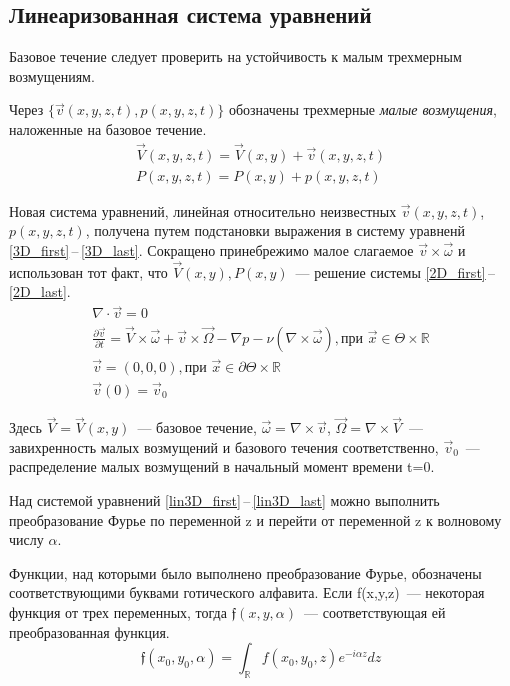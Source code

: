 \subsection{Линеаризованная система уравнений}

Базовое течение следует проверить на устойчивость к малым трехмерным возмущениям.

Через $\{ \vec v(x,y,z,t), p(x,y,z,t) \} $ обозначены трехмерные \textit{малые возмущения}, наложенные на базовое течение. 
\begin{gather*}
  \vec V(x,y,z,t) = \vec V(x,y) + \vec v(x,y,z,t) \\
  P(x,y,z,t) = P(x,y) + p(x,y,z,t)
\end{gather*}

Новая система уравнений, линейная относительно неизвестных $ \vec v(x,y,z,t)$, $p(x,y,z,t) $, получена путем подстановки выражения в систему уравненй \ref{3D_first}\,--\,\ref{3D_last}. Сокращено принебрежимо малое слагаемое $ \vec v \times \vec \omega $ и использован тот факт, что  $\vec V(x,y), P(x,y) $~--- решение системы \ref{2D_first}\,--\,\ref{2D_last}.
\begin{gather} 
  \label{lin3D_first}
  \nabla \cdot \vec v = 0\\
  \frac{\partial \vec v}{\partial t} = \vec V \times \vec \omega + \vec v \times \vec \Omega - \nabla p - \nu ( \nabla \times \vec \omega ), \text{при } \vec x \in \Theta \times \mathbb{R}\\
  \vec v = (0,0,0), \text{при } \vec x \in \partial \Theta \times \mathbb{R} \\
  \vec v (0) = \vec v _0 \label{lin3D_last}
\end{gather}

Здесь $\vec V = \vec V(x,y) $~--- базовое течение, $ \vec \omega = \nabla \times \vec v $, $ \vec \Omega = \nabla \times \vec V $~--- завихренность малых возмущений и базового течения соответственно, $\vec v_0$~--- распределение малых возмущений в начальный момент времени t=0. 

Над системой уравнений \ref{lin3D_first}\,--\,\ref{lin3D_last} можно выполнить преобразование Фурье по переменной z и перейти от переменной z к волновому числу $\alpha$.

Функции, над которыми было выполнено преобразование Фурье, обозначены соответствующими буквами готического алфавита. Если f(x,y,z)~--- некоторая функция от трех переменных, тогда $ \mathfrak{f}(x,y,\alpha) $~--- соответствующая ей преобразованная функция.
$$
 \mathfrak{f}(x_0,y_0,\alpha) = \int_\mathbb{R} f(x_0,y_0,z) e^{-i\alpha z} dz 
$$

